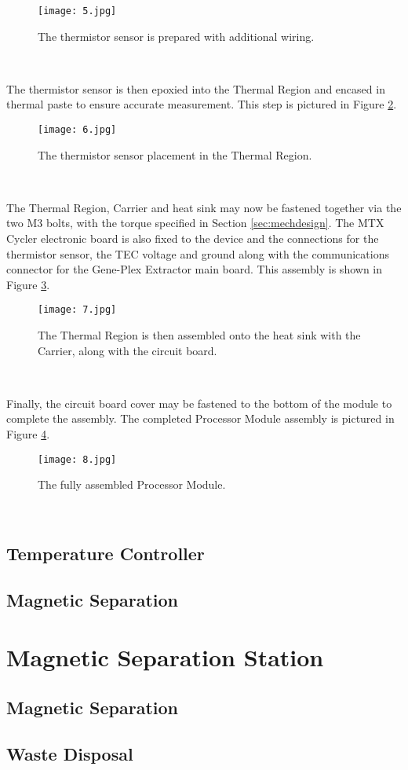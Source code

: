 \begin{figure}[!htb]
	\centering
	\texttt{[image: 5.jpg]}
	\caption[Thermistor Preparation.]{The thermistor sensor is prepared with additional wiring.}
	\label{fig:5}
\end{figure} 
\FloatBarrier

The thermistor sensor is then epoxied into the Thermal Region and encased in thermal paste to ensure accurate measurement. This step is pictured in Figure \ref{fig:6}.

\begin{figure}[!htb]
	\centering
	\texttt{[image: 6.jpg]}
	\caption[Thermistor Placement.]{The thermistor sensor placement in the Thermal Region.}
	\label{fig:6}
\end{figure} 
\FloatBarrier

The Thermal Region, Carrier and heat sink may now be fastened together via the two M3 bolts, with the torque specified in Section \ref{sec:mechdesign}. The MTX Cycler electronic board is also fixed to the device and the connections for the thermistor sensor, the TEC voltage and ground along with the communications connector for the Gene-Plex Extractor main board. This assembly is shown in Figure \ref{fig:7}. 

\begin{figure}[!htb]
	\centering
	\texttt{[image: 7.jpg]}
	\caption[Thermal Region and Board Assembly.]{The Thermal Region is then assembled onto the heat sink with the Carrier, along with the circuit board.}
	\label{fig:7}
\end{figure} 
\FloatBarrier

Finally, the circuit board cover may be fastened to the bottom of the module to complete the assembly. The completed Processor Module assembly is pictured in Figure \ref{fig:8}.

\begin{figure}[!htb]
	\centering
	\texttt{[image: 8.jpg]}
	\caption[Assembled Processor Mpdule.]{The fully assembled Processor Module.}
	\label{fig:8}
\end{figure} 
\FloatBarrier

\subsection{Temperature Controller}
\label{sec:ControllerDesign}

\subsection{Magnetic Separation}

\section{Magnetic Separation Station}

\subsection{Magnetic Separation}

\subsection{Waste Disposal}
